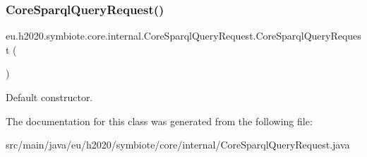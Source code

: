 \subsubsection{\texorpdfstring{Core\+Sparql\+Query\+Request()}{CoreSparqlQueryRequest()}}
{\footnotesize\ttfamily eu.\+h2020.\+symbiote.\+core.\+internal.\+Core\+Sparql\+Query\+Request.\+Core\+Sparql\+Query\+Request (\begin{DoxyParamCaption}{ }\end{DoxyParamCaption})}

Default constructor. 

The documentation for this class was generated from the following file\+:\begin{DoxyCompactItemize}
\item 
src/main/java/eu/h2020/symbiote/core/internal/Core\+Sparql\+Query\+Request.\+java\end{DoxyCompactItemize}
